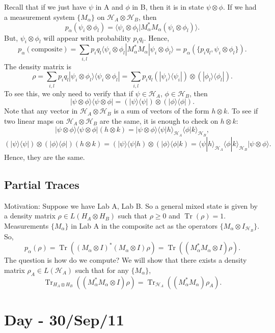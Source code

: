 \documentclass[12pt]{article}
\theoremstyle{definition}
\newcommand{\ket}[1]{|#1\rangle}
\newcommand{\ketbra}[2]{|#1\rangle\langle #2|}
\DeclareMathOperator{\Tr}{Tr}
\begin{document}
Recall that if we just have $\psi$ in A and $\phi$ in B, then it is in state $\psi \otimes \phi$. If we had a measurement system $\{M_\alpha\}$ on $\mathcal{H}_A \otimes \mathcal{H}_B$, then
\[
p_\alpha(\psi_i \otimes \phi_l) = \langle \psi_i \otimes \phi_l|M_\alpha^*M_\alpha (\psi_i \otimes \phi_l)\rangle.
\]
But, $\psi_i \otimes \phi_l$ will appear with probability $p_iq_l$. Hence,
\[
p_\alpha(\text{composite}) = \sum_{i,l} p_iq_l \langle \psi_i \otimes \phi_l|M_\alpha^*M_\alpha|\psi_i \otimes \phi_l\rangle = p_\alpha(\{p_iq_l,\psi_i \otimes \phi_l\}).
\]
The density matrix is
\[
\rho = \sum_{i,l} p_iq_l \ketbra{\psi_i \otimes \phi_l}{\psi_i \otimes \phi_l} = \sum_{i,l} p_iq_l (\ketbra{\psi_i}{\psi_i}) \otimes (\ketbra{\phi_l}{\phi_l}).
\]
To see this, we only need to verify that if $\psi \in \mathcal{H}_A$, $\phi \in \mathcal{H}_B$, then
\[
\ketbra{\psi \otimes \phi}{\psi \otimes \phi} = (\ketbra{\psi}{\psi}) \otimes (\ketbra{\phi}{\phi}).
\]
Note that any vector in $\mathcal{H}_A \otimes \mathcal{H}_B$ is a sum of vectors of the form $h \otimes k$. To see if two linear maps on $\mathcal{H}_A \otimes \mathcal{H}_B$ are the same, it is enough to check on $h \otimes k$:
\[
\ketbra{\psi \otimes \phi}{\psi \otimes \phi}(h \otimes k) = \ket{\psi \otimes \phi}\langle\psi|h\rangle_{\mathcal{H}_A}\langle\phi|k\rangle_{\mathcal{H}_B},
\]
\[
(\ketbra{\psi}{\psi}) \otimes (\ketbra{\phi}{\phi})(h \otimes k) = (\ketbra{\psi}{\psi}h) \otimes (\ketbra{\phi}{\phi}k) = \langle\psi|h\rangle_{\mathcal{H}_A}\langle\phi|k\rangle_{\mathcal{H}_B}\ket{\psi \otimes \phi}.
\]
Hence, they are the same.

\subsection{Partial Traces}

Motivation: Suppose we have Lab A, Lab B. So a general mixed state is given by a density matrix $\rho \in L(H_A \otimes H_B)$ such that $\rho \geq 0$ and $\Tr(\rho) = 1$. Measurements $\{M_\alpha\}$ in Lab A in the composite act as the operators $\{M_\alpha \otimes I_{\mathcal{H}_B}\}$.
So,
\[
p_\alpha(\rho) = \Tr((M_\alpha \otimes I)^*(M_\alpha \otimes I)\rho) = \Tr((M_\alpha^*M_\alpha \otimes I)\rho).
\]
The question is how do we compute? We will show that there exists a density matrix $\rho_A \in L(\mathcal{H}_A)$ such that for any $\{M_\alpha\}$,
\[
\Tr_{H_A \otimes H_B}((M_\alpha^*M_\alpha \otimes I)\rho) = \Tr_{\mathcal{H}_A}((M_\alpha^*M_\alpha)\rho_A).
\]


\section{Day - 30/Sep/11}
\end{document}
